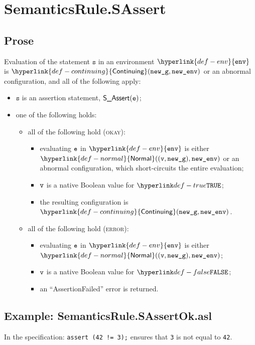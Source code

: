 \documentclass{book}
\newcommand\ProseOrAbnormal[0]{or an abnormal configuration, which short-circuits the entire evaluation}
\newcommand\Normal[0]{\hyperlink{def-normal}{\textsf{Normal}}}
\newcommand\Continuing[0]{\hyperlink{def-continuing}{\textsf{Continuing}}}
\newcommand\env[0]{\hyperlink{def-env}{\texttt{env}}}
\newcommand\newg[0]{\texttt{new\_g}}
\newcommand\vs[0]{\texttt{s}}
\begin{document}
\section{SemanticsRule.SAssert \label{sec:SemanticsRule.SAssert}}
    \subsection{Prose}
    Evaluation of the statement $\vs$ in an environment $\env$ is
    $\Continuing(\newg, \newenv)$ or an abnormal configuration,
    and all of the following apply:
    \begin{itemize}
      \item $\vs$ is an assertion statement, $\textsf{S\_Assert}(\texttt{e})$;
      \item one of the following holds:
      \begin{itemize}
        \item all of the following hold (\textsc{okay}):
        \begin{itemize}
          \item evaluating $\texttt{e}$ in $\env$ is either $\Normal((\vv, \newg), \newenv)$
          \ProseOrAbnormal;
          \item $\texttt{v}$ is a native Boolean value for $\True$;
          \item the resulting configuration is $\Continuing(\newg, \newenv)$.
        \end{itemize}

        \item all of the following hold (\textsc{error}):
        \begin{itemize}
          \item evaluating $\texttt{e}$ in $\env$ is either $\Normal((\vv, \newg), \newenv)$;
          \item $\texttt{v}$ is a native Boolean value for $\False$;
          \item an ``AssertionFailed'' error is returned.
        \end{itemize}
      \end{itemize}
    \end{itemize}

    \subsection{Example: SemanticsRule.SAssertOk.asl}
    In the specification:
    \texttt{assert (42 != 3);} ensures that \texttt{3} is not equal to \texttt{42}.
\end{document}
